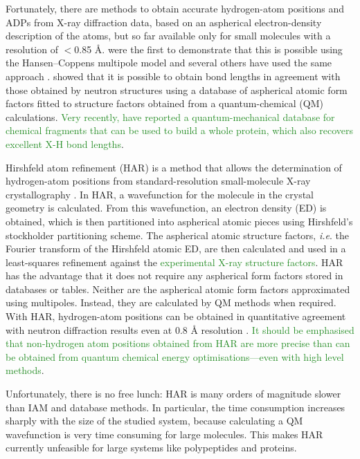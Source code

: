 \documentclass[preprint,dvipsnames]{iucr}              %
\newcommand{\changed}[1]{\textcolor{ForestGreen}{#1}}
\begin{document}
Fortunately, there are methods to obtain accurate hydrogen-atom 
positions and ADPs from X-ray diffraction data, based on an aspherical electron-density description of the atoms, but so far available only for small molecules
with a resolution of $<$0.85 \AA.
 were the first to demonstrate 
that this is possible using the Hansen--Coppens multipole model 
and several others have used the same approach
\cite{zhurov2011importance,zhurov2013charge}. 
 showed that it is possible 
to obtain  bond lengths in agreement with those obtained by neutron structures using 
a database of aspherical atomic form factors fitted to structure factors
obtained from a quantum-chemical (QM) calculations.
\changed{Very recently,  have reported a
quantum-mechanical database for chemical fragments that can be used to build 
a whole protein, which also recovers
excellent X-H bond lengths}.



Hirshfeld atom refinement (HAR) is a method that
allows the determination of hydrogen-atom positions 
from standard-resolution small-molecule X-ray crystallography
\cite{jayatilaka2008x,capelli2014hirshfeld}.
In HAR,  a wavefunction for the molecule in the crystal geometry 
is calculated. From this wavefunction, an electron density (ED)
is obtained,  which is then partitioned into aspherical atomic pieces 
using Hirshfeld's stockholder  partitioning scheme. The aspherical 
atomic structure factors, {\em i.e}. the Fourier transform of the Hirshfeld atomic ED, 
are then calculated and used in a least-squares refinement  
against the \changed{experimental X-ray structure factors}. 
HAR has the advantage that  it does not require any 
aspherical form factors stored in databases or tables. 
Neither are the aspherical atomic form factors approximated using multipoles. 
Instead, they are calculated by QM methods when required.
With HAR, hydrogen-atom  positions can be obtained in quantitative 
agreement with neutron diffraction results even at 0.8 {\AA} 
resolution \cite{woinska2016hydrogen}.
\changed{It should be emphasised that non-hydrogen atom positions 
obtained from HAR are more precise than can be obtained from quantum 
chemical energy optimisations---even with high level methods}.


Unfortunately, there is no free lunch: HAR is many orders of magnitude 
slower than IAM and database  methods. In particular, the time consumption 
increases sharply with the size of the studied system, because calculating 
a QM wavefunction is very time consuming for large molecules. This makes HAR 
currently unfeasible for large systems like polypeptides and proteins. 
\end{document}
